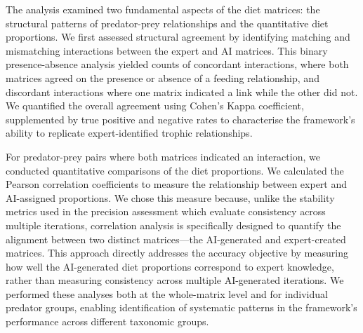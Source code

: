 The analysis examined two fundamental aspects of the diet matrices: the structural patterns of predator-prey relationships and the quantitative diet proportions. We first assessed structural agreement by identifying matching and mismatching interactions between the expert and AI matrices. This binary presence-absence analysis yielded counts of concordant interactions, where both matrices agreed on the presence or absence of a feeding relationship, and discordant interactions where one matrix indicated a link while the other did not. We quantified the overall agreement using Cohen's Kappa coefficient, supplemented by true positive and negative rates to characterise the framework's ability to replicate expert-identified trophic relationships.

For predator-prey pairs where both matrices indicated an interaction, we conducted quantitative comparisons of the diet proportions. We calculated the Pearson correlation coefficients to measure the relationship between expert and AI-assigned proportions. We chose this measure because, unlike the stability metrics used in the precision assessment which evaluate consistency across multiple iterations, correlation analysis is specifically designed to quantify the alignment between two distinct matrices—the AI-generated and expert-created matrices. This approach directly addresses the accuracy objective by measuring how well the AI-generated diet proportions correspond to expert knowledge, rather than measuring consistency across multiple AI-generated iterations. We performed these analyses both at the whole-matrix level and for individual predator groups, enabling identification of systematic patterns in the framework's performance across different taxonomic groups.
